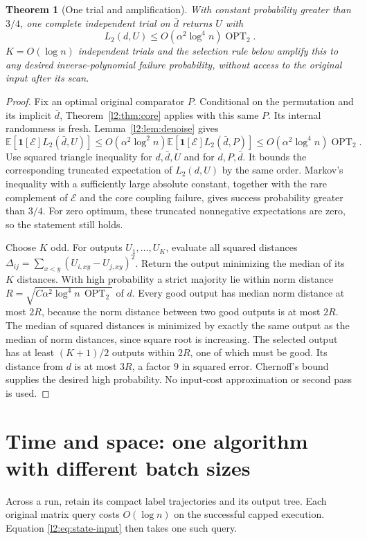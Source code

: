 \documentclass[11pt]{article}
\newtheorem{theorem}{Theorem}[section]
\theoremstyle{definition}
\newcommand{\E}{\mathbb E}
\newcommand{\ind}{\mathbf 1}
\newcommand{\OPT}{\operatorname{OPT}}
\begin{document}
\begin{theorem}[One trial and amplification]\label{l2:thm:approx}
With constant probability greater than $3/4$, one complete independent
trial on $\bar d$ returns $U$ with
\[
 L_2(d,U)\le O(\alpha^2\log^4 n)\OPT_2.
\]
$K=O(\log n)$ independent trials and the selection rule below amplify
this to any desired inverse-polynomial failure probability, without
access to the original input after its scan.
\end{theorem}
\begin{proof}
Fix an optimal original comparator $P$. Conditional on the permutation
and its implicit $\bar d$, Theorem~\ref{l2:thm:core} applies with this same
$P$. Its internal randomness is fresh. Lemma~\ref{l2:lem:denoise} gives
\[
 \E[\ind[\mathcal E]L_2(\bar d,U)]
 \le O(\alpha^2\log^2 n)
        \E[\ind[\mathcal E]L_2(\bar d,P)]
 \le O(\alpha^2\log^4 n)\OPT_2.
\]
Use squared triangle inequality for $d,\bar d,U$ and for $d,P,\bar d$.
It bounds the corresponding truncated expectation of $L_2(d,U)$ by
the same order. Markov's inequality with a sufficiently large absolute
constant, together with the rare complement of $\mathcal E$ and the
core coupling failure, gives success probability greater than $3/4$.
For zero optimum, these truncated nonnegative expectations are zero,
so the statement still holds.

Choose $K$ odd. For outputs $U_1,\ldots,U_K$, evaluate all squared
distances $\Delta_{ij}=\sum_{x<y}(U_{i,xy}-U_{j,xy})^2$.
Return the output minimizing the median of its $K$ distances.
With high probability a strict majority lie within norm distance
$R=\sqrt{C\alpha^2\log^4 n\,\OPT_2}$ of $d$.
Every good output has median norm distance at most $2R$, because the norm distance between two good outputs is at most $2R$. The median of squared distances is minimized by exactly the same output as the median of norm distances, since square root is increasing. The selected
output has at least $(K+1)/2$ outputs within $2R$, one of which must
be good. Its distance from $d$ is at most $3R$, a factor $9$ in squared
error. Chernoff's bound supplies the desired high probability.
No input-cost approximation or second pass is used.
\end{proof}

\section{Time and space: one algorithm with different batch sizes}

Across a run, retain its compact label trajectories and its output tree.
Each original matrix query costs $O(\log n)$ on the successful capped
execution. Equation \eqref{l2:eq:state-input} then takes one such query.
\end{document}
